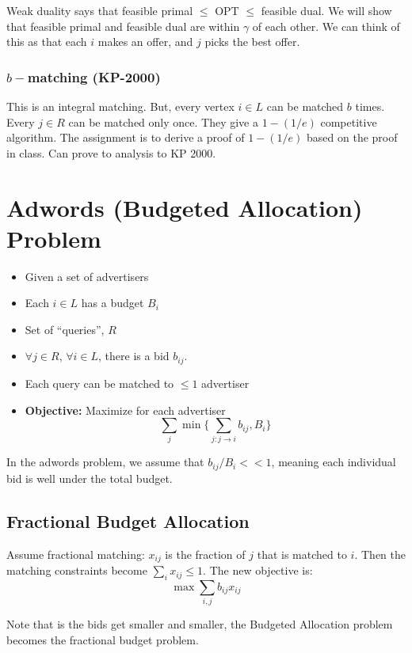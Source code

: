 Weak duality says that feasible primal $\leq$ OPT $\leq$ feasible dual. We will show that feasible primal and feasible dual are within $\gamma$ of each other. We can think of this as that each $i$ makes an offer, and $j$ picks the best offer.

\subsubsection{$b-$matching (KP-2000)}
This is an integral matching. But, every vertex $i \in L$ can be matched $b$ times. Every $j \in R$ can be matched only once. They give a $1 - (1/e)$ competitive algorithm. The assignment is to derive a proof of $1 - (1/e)$ based on the proof in class. Can prove to analysis to KP 2000.

\section{Adwords (Budgeted Allocation) Problem}
\begin{itemize}
\item Given a set of advertisers
\item Each $i \in L$ has a budget $B_{i}$
\item Set of ``queries'', $R$
\item $\forall j \in R$, $\forall i \in L$, there is a bid $b_{ij}$.
\item Each query can be matched to $\leq 1$ advertiser
\item \textbf{Objective:} Maximize for each advertiser 
  \begin{equation*}
    \sum_{j} \min \{ \sum_{j:j \rightarrow i} b_{ij}, B_{i} \}
  \end{equation*}
\end{itemize}


In the adwords problem, we assume that $b_{ij}/B_{i} << 1$, meaning each individual bid is well under the total budget.

\subsection{Fractional Budget Allocation}
Assume fractional matching: $x_{ij}$ is the fraction of $j$ that is matched to $i$. Then the matching constraints become $\sum_{i} x_{ij} \leq 1$.
The new objective is:
  \begin{equation*}
\max \sum_{i,j} b_{ij} x_{ij}
  \end{equation*}

Note that is the bids get smaller and smaller, the Budgeted Allocation problem becomes the fractional budget problem.

